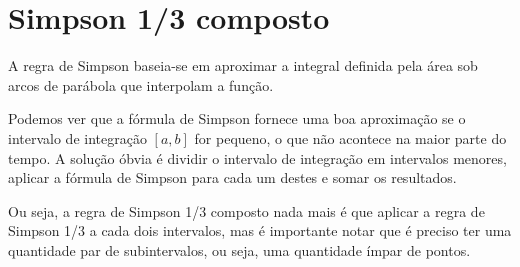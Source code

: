 \chapter{Simpson 1/3 composto}
A regra de Simpson baseia-se em aproximar a integral definida pela área sob arcos de parábola que interpolam a função.

Podemos ver que a fórmula de Simpson fornece uma boa aproximação se o intervalo de integração \([ a , b ]\) for pequeno, o que não acontece na maior parte do tempo. A solução óbvia é dividir o intervalo de integração em intervalos menores, aplicar a fórmula de Simpson para cada um destes e somar os resultados.

Ou seja, a regra de Simpson 1/3 composto nada mais é que aplicar a regra de Simpson 1/3 a cada dois intervalos, mas é importante notar que é preciso ter uma quantidade par de subintervalos, ou seja, uma quantidade ímpar de pontos.

